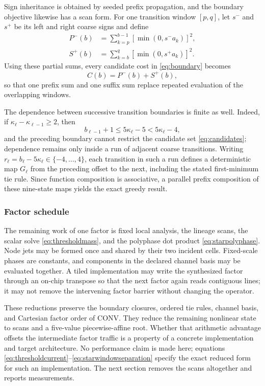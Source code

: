 \documentclass[journal]{IEEEtran}
\begin{document}
Sign inheritance is obtained by seeded prefix propagation, and the boundary
objective likewise has a scan form. For one transition window
\([p,q]\), let \(s^-\) and \(s^+\) be its left and right coarse signs and
define
\begin{align}
 P^-(b)&=\sum_{k=p}^{b-1}[\min(0,s^-a_k)]^2,\nonumber\\
 S^+(b)&=\sum_{k=b}^{q}[\min(0,s^+a_k)]^2.
 \label{eq:starconflictscan}
\end{align}
Using these partial sums, every candidate cost in \eqref{eq:boundary} becomes
\begin{equation}
 C(b)=P^-(b)+S^+(b),
 \label{eq:starboundarycost}
\end{equation}
so that one prefix sum and one suffix sum replace repeated evaluation of the
overlapping windows.

The dependence between successive transition boundaries is finite as well.
Indeed, if \(\kappa_\ell-\kappa_{\ell-1}\geq2\), then
\begin{equation}
 b_{\ell-1}+1\leq5\kappa_\ell-5<5\kappa_\ell-4,
 \label{eq:starwindowseparation}
\end{equation}
and the preceding boundary cannot restrict the candidate set
\eqref{eq:candidates}; dependence remains only inside a run of adjacent
coarse transitions. Writing
\(r_\ell=b_\ell-5\kappa_\ell\in\{-4,\ldots,4\}\), each transition in such a
run defines a deterministic map \(G_\ell\) from the preceding offset to the
next, including the stated first-minimum tie rule. Since function composition
is associative, a parallel prefix composition of these nine-state maps yields
the exact greedy result.

\subsubsection{Factor schedule}

The remaining work of one factor is fixed local analysis, the lineage scans,
the scalar solve \eqref{eq:thresholdmass}, and the polyphase dot product
\eqref{eq:starpolyphase}. Node jets may be formed once and shared by their two
incident cells. Fixed-scale phases are constants, and components in the
declared channel basis may be evaluated together. A tiled implementation may
write the synthesized factor through an on-chip transpose so that the next
factor again reads contiguous lines; it may not remove the intervening factor
barrier without changing the operator.

These reductions preserve the boundary closures, ordered tie rules, channel
basis, and Cartesian factor order of CONV. They reduce the remaining
nonlinear state to scans and a five-value piecewise-affine root. Whether that
arithmetic advantage offsets the intermediate factor traffic is a property
of a concrete implementation and target architecture. No performance claim
is made here; equations \eqref{eq:thresholdcurrent}--\eqref{eq:starwindowseparation}
specify the exact reduced form for such an implementation. The next
section removes the scans altogether and reports measurements.
\end{document}
